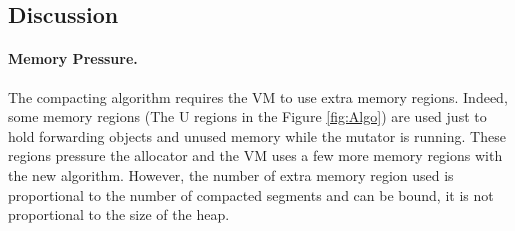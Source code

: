\documentclass[sigplan,10pt,review,anonymous]{acmart}\settopmatter{printfolios=true,printccs=false,printacmref=false}
\newcommand{\eem}[1]{\color{olive}\fbox{\bfseries\sffamily\scriptsize Eliot:}{\sf\small$\blacktriangleright$\textit{#1}$\blacktriangleleft$}\color{black}}
\def\OpenSmalltalkVM{OpenSmalltalk-VM\xspace}
\begin{document}

\subsection{Discussion}
\label{sec:discussion}


\paragraph{Memory Pressure.}
The compacting algorithm requires the VM to use extra memory regions. Indeed, some memory regions (The U regions in the Figure \ref{fig:Algo}) are used just to hold forwarding objects and unused memory while the mutator is running. These regions pressure the allocator and the VM uses a few more memory regions with the new algorithm. However, the number of extra memory region used is proportional to the number of compacted segments and can be bound, it is not proportional to the size of the heap. %
\end{document}
